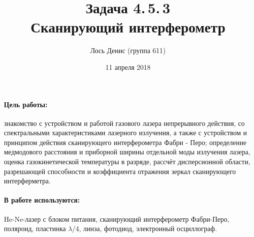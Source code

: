 \documentclass[12pt]{article}
\title{{\bf Задача 4.\,5.\,3 \\ Сканирующий интерферометр}}
\author{Лось Денис (группа 611)}
\date{11 апреля 2018}
\begin{document}
\maketitle

\paragraph{Цель работы: } знакомство с устройством и работой газового лазера непрерывного действия, со спектральными характеристиками лазерного излучения, а также с устройством и принципом действия сканирующего интерферометра Фабри - Перо; определение медмодового расстояния и приборной ширины отдельной моды излучения лазера, оценка газокинетической температуры в разряде, рассчёт дисперсионной области, разрешающей способности и коэффициента отражения зеркал сканирующего интерферметра.

\paragraph{В работе используются: } He-Ne-лазер с блоком питания, сканирующий интерферометр Фабри-Перо, поляроид, пластинка $\lambda / 4$, линза, фотодиод, электронный осциллограф.
\end{document}
